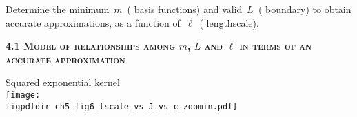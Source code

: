 \documentclass[landscape,a1,final]{a0poster} %
\let\tempone\itemize
\let\temptwo\enditemize
\renewenvironment{itemize}{\tempone\addtolength{\itemsep}{-0.3\baselineskip}}{\temptwo}
\def\figpdfdir{fig/} %
\begin{document}
\begin{minipage}{1\linewidth}
\begin{minipage}[t]{0.31\textwidth}
\begin{itemize}\setlength\itemsep{2mm}
\item Determine the minimum\, $m$\, ({\color{navyblue} basis functions}) and valid\, $L$\, ({\color{navyblue} boundary}) to obtain accurate approximations, as a function of\, $\ell$\, ({\color{navyblue} lengthscale}).

\end{itemize}







\end{minipage}%
\hspace{0.015\linewidth} 
\begin{minipage}[t]{0.345\textwidth}
\vspace{0pt}
\setlength{\parindent}{10mm}

\vspace{-0.8cm}
\hspace{-1cm}
\textsc{\textbf{4.1 Model of relationships among $m$, $L$ and $\ell$ in terms of an accurate approximation}}

\vspace{4mm}
\hspace{-1.3cm}
\begin{minipage}{0.32\textwidth}
\hspace{0.22\textwidth} \scriptsize Squared exponential kernel\\
\texttt{[image: \\figpdfdir ch5\_fig6\_lscale\_vs\_J\_vs\_c\_zoomin.pdf]} \;\;

\end{minipage}
\begin{minipage}{0.67\textwidth}


\end{minipage}
\end{minipage}
\end{minipage}
\end{document}

